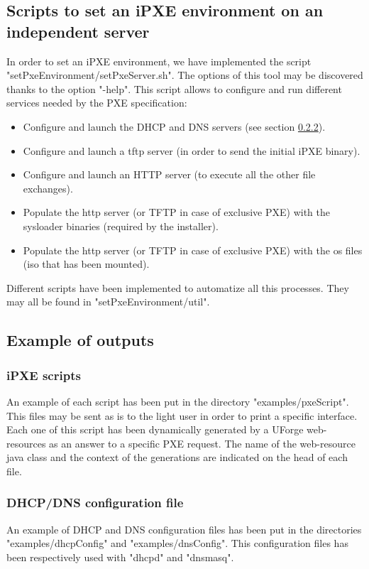 \documentclass[12pt]{article}											%
\begin{document}
\subsection{Scripts to set an iPXE environment on an independent server}
	In order to set an iPXE environment, we have implemented the script "setPxeEnvironment/setPxeServer.sh".   The options of this tool may be discovered thanks to the option "-help".   This script allows to configure and run different services needed by the PXE specification:
	\begin{itemize}
		\item Configure and launch the DHCP and DNS servers (see section \ref{dhcp_dns_configFile}).
		\item Configure and launch a tftp server (in order to send the initial iPXE binary).
		\item Configure and launch an HTTP server (to execute all the other file exchanges).
		\item Populate the http server (or TFTP in case of exclusive PXE) with the sysloader binaries (required by the installer).
		\item Populate the http server (or TFTP in case of exclusive PXE) with the os files (iso that has been mounted).
	\end{itemize}
	Different scripts have been implemented to automatize all this processes.   They may all be found in "setPxeEnvironment/util".


\subsection{Example of outputs}
	\subsubsection{iPXE scripts}
	An example of each script has been put in the directory "examples/pxeScript".   This files may be sent as is to the light user in order to print a specific interface.   Each one of this script has been dynamically generated by a UForge web-resources as an answer to a specific PXE request.   The name of the web-resource java class and the context of the generations are indicated on the head of each file. 

	\subsubsection{DHCP/DNS configuration file} \label{dhcp_dns_configFile}
	An example of DHCP and DNS configuration files has been put in the directories "examples/dhcpConfig" and "examples/dnsConfig".   This configuration files has been respectively used with "dhcpd" and "dnsmasq".
\end{document}
